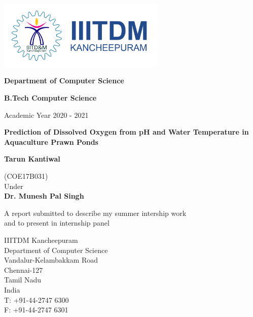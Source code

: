 \begin{titlepage}
    \begin{center}
        \vspace*{0.1cm}
        
          
        \includegraphics[width=0.6\textwidth]{images/SecondaryLogo.png}
        
        \large
         \textbf{Department of Computer Science}
         \vspace{1cm}
         
         \textbf{B.Tech Computer Science}
         \vspace{1cm}
         
         Academic Year 2020 - 2021
         
         
         \vspace{2cm}
        
        
        \LARGE
        \textbf{Prediction of Dissolved Oxygen from pH and Water Temperature in Aquaculture Prawn Ponds}
        
        
        \vspace{1.5cm}
        \large
        \textbf{Tarun Kantiwal}
        
        (COE17B031)\\
        Under\\
        \large
        \textbf{Dr. Munesh Pal Singh}
        
        
        \vspace{1.5cm}
        A report submitted to describe my summer intership work \\and to present in internship panel

        
        \vspace{0.8cm}
      \begin{flushright}
        \footnotesize
        IIITDM Kancheepuram \\
        Department of Computer Science\\
        Vandalur-Kelambakkam Road\\
        Chennai-127\\
        Tamil Nadu\\
        India \\
        T: +91-44-2747 6300\\
        F: +91-44-2747 6301\\
        \end{flushright}
        
    \end{center}
\end{titlepage}
